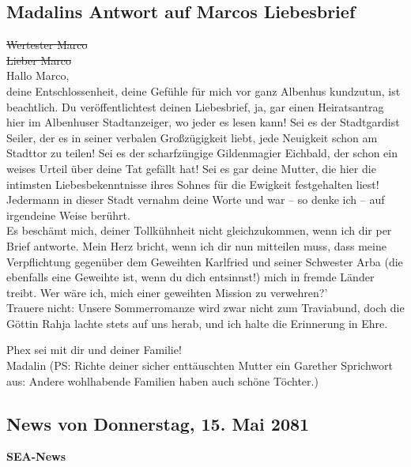 \documentclass[final]{multiversum}
\begin{document}
\makemultititle
%


\subsection{Madalins Antwort auf Marcos Liebesbrief}
\sout{Wertester Marco}\\
\sout{Lieber Marco}\\
Hallo Marco,\\
deine Entschlossenheit, deine Gefühle für mich vor ganz Albenhus kundzutun, ist
beachtlich. Du veröffentlichtest deinen Liebesbrief, ja, gar einen Heiratsantrag
hier im Albenhuser Stadtanzeiger, wo jeder es lesen kann! Sei es der
Stadtgardist Seiler, der es in seiner verbalen Großzügigkeit liebt, jede
Neuigkeit schon am Stadttor zu teilen! Sei es der scharfzüngige Gildenmagier
Eichbald, der schon ein weises Urteil über deine Tat gefällt hat! Sei es gar
deine Mutter, die hier die intimsten Liebesbekenntnisse ihres Sohnes für die
Ewigkeit festgehalten liest! Jedermann in dieser Stadt vernahm deine Worte und
war -- so denke ich -- auf irgendeine Weise berührt.\\
Es beschämt mich, deiner Tollkühnheit nicht gleichzukommen, wenn ich dir per
Brief antworte. Mein Herz bricht, wenn ich dir nun mitteilen muss, dass meine
Verpflichtung gegenüber dem Geweihten Karlfried und seiner Schwester Arba (die
ebenfalls eine Geweihte ist, wenn du dich entsinnst!) mich in fremde Länder
treibt. Wer wäre ich, mich einer geweihten Mission zu verwehren?'\\
Trauere nicht: Unsere Sommerromanze wird zwar nicht zum Traviabund, doch die
Göttin Rahja lachte stets auf uns herab, und ich halte die Erinnerung in Ehre.

Phex sei mit dir und deiner Familie!\\
Madalin
(PS: Richte deiner sicher enttäuschten Mutter ein Garether Sprichwort
aus: Andere wohlhabende Familien haben auch schöne Töchter.)

\subsection{News von Donnerstag, 15. Mai 2081}
\textbf{SEA-News}
\end{document}
